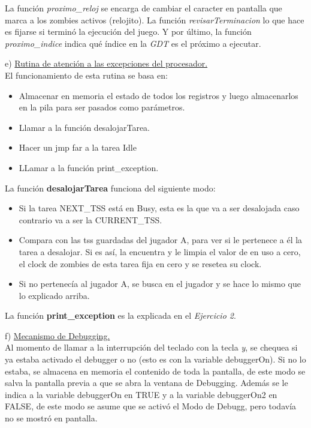 \documentclass[a4paper]{article}
\begin{document}
La funci\'on \textit{proximo_reloj} se encarga de cambiar el caracter en pantalla que marca a los zombies activos (relojito). La funci\'on  \textit{revisarTerminacion} lo que hace es fijarse si termin\'o la ejecuci\'on del juego. Y por \'ultimo, la funci\'on \textit{proximo_indice} indica qu\'e \'indice en la \emph{GDT} es el pr\'oximo a ejecutar.


\bigskip

{\large e)} \underline{Rutina de atenci\'on a las excepciones del procesador.}\\

El funcionamiento de esta rutina se basa en:

\begin{itemize}
\item Almacenar en memoria el estado de todos los registros y luego almacenarlos en la pila para ser pasados como par\'ametros.
\item Llamar a la funci\'on desalojarTarea.
\item Hacer un jmp far a la tarea Idle
\item LLamar a la funci\'on print_exception.
\end{itemize}
\bigskip

La funci\'on \textbf{desalojarTarea} funciona del siguiente modo:

\begin{itemize}
\item Si la tarea NEXT_TSS est\'a en Busy, esta es la que va a ser desalojada caso contrario va a ser la CURRENT_TSS.
\item Compara con las tss guardadas del jugador A, para ver si le pertenece a \'el la tarea a desalojar. Si es as\'i, la encuentra y le limpia el valor de en uso a cero, el clock de zombies de esta tarea fija en cero y se resetea su clock.
\item Si no pertenec\'ia al jugador A, se busca en el jugador y se hace lo mismo que lo explicado arriba.
\end{itemize}
\bigskip

La funci\'on \textbf{print_exception} es la explicada en el \emph{Ejercicio 2}.

\bigskip

\newpage
{\large f)} \underline{Mecanismo de Debugging.}\\

Al momento de llamar a la interrupci\'on del teclado con la tecla \emph{y}, se chequea si ya estaba activado el debugger o no (esto es con la variable debuggerOn). Si no lo estaba, se almacena en memoria el contenido de toda la pantalla, de este modo se salva la pantalla previa a que se abra la ventana de Debugging. Adem\'as se le indica a la variable debuggerOn en TRUE y a la variable debuggerOn2 en FALSE, de este modo se asume que se activ\'o el Modo de Debugg, pero todav\'ia no se mostr\'o en pantalla.
\end{document}
